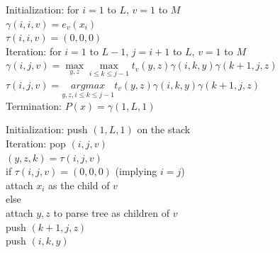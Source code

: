\documentclass[a4paper, 12pt]{article}
\begin{document}
\begin{algorithm}[h!] 
 \vspace*{0.2cm}
 Initialization: \hspace{0.01cm} for $i = 1$ to $L$, $v = 1$ to $M$ \\
 		 \hspace{3.3cm} $\gamma(i, i, v) = e_v(x_i)$ \\
 		 \hspace{3.3cm} $\tau(i, i, v) = (0, 0, 0)$ \\
 \vspace*{0.2cm}
 Iteration:  \hspace{0.71cm} for $i = 1$ to $L - 1$, $j = i + 1$ to $L$, $v = 1$ to $M$ \\
             \hspace{3.3cm} $\gamma(i, j, v) = \underset{y,z}{\max} \underset{i \leq k \leq j-1}{\max} t_v(y, z) \gamma(i, k, y) \gamma(k+1, j, z)$\\
             \hspace{3.3cm} $\tau(i, j, v) = \underset{y, z, i \leq k \leq j-1}{argmax} t_v(y, z) \gamma(i, k, y) \gamma(k+1, j, z)$\\ 
 \vspace*{0.2cm}
 Termination: \hspace{0.11cm} $P(x) = \gamma(1, L, 1)$ \\
\end{algorithm}

\begin{algorithm}[h!] 
 \vspace*{0.2cm}
 Initialization: \hspace{0.01cm} push $(1, L, 1)$ on the stack \\
 \vspace*{0.2cm}
 Iteration:  \hspace{0.71cm} pop $(i, j, v)$ \\ 
             \hspace{2.5cm} $(y, z, k) = \tau(i, j, v)$ \\ 
             \hspace{2.5cm} if $\tau(i, j, v) = (0, 0, 0)$ (implying $i = j$) \\
             \hspace{3.3cm}attach $x_i$ as the child of $v$ \\
             \hspace{2.5cm} else \\
             \hspace{3.3cm} attach $y, z$ to parse tree as children of $v$ \\
             \hspace{3.3cm} push $(k+1, j, z)$ \\
             \hspace{3.3cm} push $(i, k, y)$ \\ 
\end{algorithm}
\end{document}

